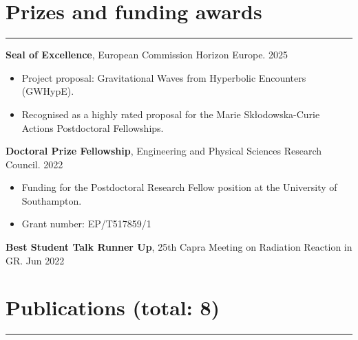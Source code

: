 \documentclass[10.5pt, oneside]{article}   	%
\begin{document}

{\color{Sectioncolour}
\section*{Prizes and funding awards}
\vspace{-3mm}
\noindent\rule{\linewidth}{0.6pt}}

\textbf{Seal of Excellence}, European Commission Horizon Europe. \hfill 2025 \\
\vspace{-5mm}
\begin{itemize}
\item Project proposal: Gravitational Waves from Hyperbolic Encounters (GWHypE).
\item Recognised as a highly rated proposal for the Marie Skłodowska-Curie Actions Postdoctoral Fellowships.
\end{itemize}
\textbf{Doctoral Prize Fellowship}, Engineering and Physical Sciences Research Council. \hfill 2022 \\
\vspace{-5mm}
\begin{itemize}
\item Funding for the Postdoctoral Research Fellow position at the University of Southampton.
\item Grant number: EP/T517859/1
\end{itemize}
\textbf{Best Student Talk Runner Up}, 25th Capra Meeting on Radiation Reaction in GR. \hfill Jun 2022 \\
 

\newpage

{\color{Sectioncolour}
\section*{Publications {\rm (total: 8)}}
\vspace{-3mm}
\noindent\rule{\linewidth}{0.6pt}}

\nocite{*}

\vspace{-5mm}
\printbibliography[notkeyword={prep},title={~}]
\end{document}
